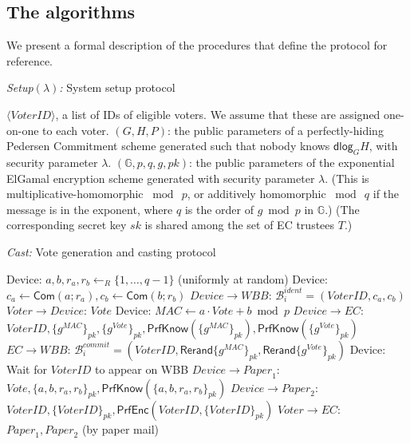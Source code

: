 \documentclass[12pt,a4paper]{article}
\newcommand{\commit}{\mathsf{Com}}
\newcommand{\PrfEnc}{\mathsf{PrfEnc}}
\newcommand{\PrfKnow}{\mathsf{PrfKnow}}
\newcommand{\rerand}{\mathsf{Rerand}}
\newcommand{\dlog}{\mathsf{dlog}}
\theoremstyle{definition}
\newcommand{\Vote}{\mathit{Vote}}
\newcommand{\VoterID}{\mathit{VoterID}}
\newcommand{\Paper}{\mathit{Paper}}
\newcommand{\Mac}{\mathit{MAC}}
\newcommand{\Wbb}{\mathit{WBB}}
\begin{document}
\subsection{The algorithms}
We present a formal description of the procedures that define the protocol for reference.
\singlespacing
\begin{algorithm} 	\caption{\textit{Setup}$(\lambda)$\textit{:} System setup protocol}
	\begin{algorithmic}[1]
\State $\langle \VoterID \rangle$, a list of IDs of eligible voters.  We assume that these are assigned one-on-one to each voter.
\State	$(G,H,P)$: the public parameters of a perfectly-hiding Pedersen Commitment scheme  generated such that nobody knows $\dlog_G H$, with security parameter $\lambda$.
\State $(\mathbb{G}, p, q, g, pk)$: the public parameters of the exponential ElGamal encryption scheme generated with security parameter $\lambda$.
(This is multiplicative-homomorphic $\bmod\ p$, or additively homomorphic $\bmod\ q$ if the message is in the exponent, where $q$ is the order of $g\bmod p$ in $\mathbb{G}$.)
\State  (The corresponding secret key  $sk$ is shared among the set of EC trustees $T$.)
\end{algorithmic}
	\label{fig:setup}
\end{algorithm}
\begin{algorithm} 	\caption{\textit{Cast:} Vote generation and casting protocol}
	\begin{algorithmic}[1]
	\State Device: $a,b,r_a,r_b\leftarrow_R\{1,\ldots,q-1\}$ (uniformly at random)
	\State Device: $c_a\leftarrow\commit(a;r_a), c_b\leftarrow\commit(b;r_b)$
	\State $Device\rightarrow \Wbb$: $\mathcal{B}^{ident}_i=(\VoterID, c_a, c_b)$\label{Step:VoterCommit}
	\State $Voter\rightarrow Device$: $\Vote$
	\State Device: $\Mac\leftarrow a\cdot Vote+b\bmod p$
	\State $Device\rightarrow EC$: $\VoterID, \{g^\Mac\}_{pk}, \{g^\Vote\}_{pk}, \PrfKnow(\{g^\Mac\}_{pk}), \PrfKnow(\{g^\Vote\}_{pk})$%
	\State $EC\rightarrow \Wbb$: $\mathcal{B}^{commit}_i=(\VoterID, \rerand\{g^\Mac\}_{pk}, \rerand\{g^\Vote\}_{pk})$ \label{Step:ECPostsVoteMAC}
	\State Device: Wait for $\VoterID$ to appear on WBB
	\State $Device\rightarrow \Paper_1$: $\Vote, \{a,b,r_a,r_b\}_{pk}, \PrfKnow(\{a,b,r_a,r_b\}_{pk})$
	\State $Device\rightarrow \Paper_2$: $\VoterID, \{\VoterID\}_{pk}, \PrfEnc(\VoterID, \{\VoterID\}_{pk})$
	\State $Voter\rightarrow EC$: $\Paper_1, \Paper_2$ (by paper mail)
	\end{algorithmic}
\label{fig:genAndCasting}
\end{algorithm}
\end{document}
